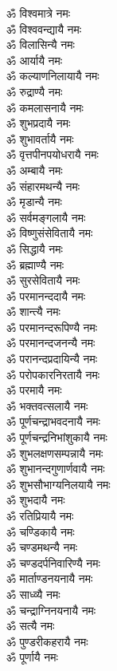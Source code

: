 \begin{multicols}{2}
\begin{flushleft}
ॐ विश्वमात्रे नमः\\
ॐ विश्ववन्द्यायै नमः\\
ॐ विलासिन्यै नमः\\
ॐ आर्यायै नमः\\
ॐ कल्याणनिलायायै नमः\\
ॐ रुद्राण्यै नमः\\
ॐ कमलासनायै नमः\\
ॐ शुभप्रदायै नमः\\
ॐ शुभावर्तायै नमः\\
ॐ वृत्तपीनपयोधरायै नमः\hfill{}\\
ॐ अम्बायै नमः\\
ॐ संहारमथन्यै नमः\\
ॐ मृडान्यै नमः\\
ॐ सर्वमङ्गलायै नमः\\
ॐ विष्णुसंसेवितायै नमः\\
ॐ सिद्धायै नमः\\
ॐ ब्रह्माण्यै नमः\\
ॐ सुरसेवितायै नमः\\
ॐ परमानन्ददायै नमः\\
ॐ शान्त्यै नमः\hfill{}\\
ॐ परमानन्दरूपिण्यै नमः\\
ॐ परमानन्दजनन्यै नमः\\
ॐ परानन्दप्रदायिन्यै नमः\\
ॐ परोपकारनिरतायै नमः\\
ॐ परमायै नमः\\
ॐ भक्तवत्सलायै नमः\\
ॐ पूर्णचन्द्राभवदनायै नमः\\
ॐ पूर्णचन्द्रनिभांशुकायै नमः\\
ॐ शुभलक्षणसम्पन्नायै नमः\\
ॐ शुभानन्दगुणार्णवायै नमः\hfill{}\\
ॐ शुभसौभाग्यनिलयायै नमः\\
ॐ शुभदायै नमः\\
ॐ रतिप्रियायै नमः\\
ॐ चण्डिकायै नमः\\
ॐ चण्डमथन्यै नमः\\
ॐ चण्डदर्पनिवारिण्यै नमः\\
ॐ मार्ताण्डनयनायै नमः\\
ॐ साध्व्यै नमः\\
ॐ चन्द्राग्निनयनायै नमः\\
ॐ सत्यै नमः\hfill{}\\
ॐ पुण्डरीकहरायै नमः\\
ॐ पूर्णायै नमः\\

\end{flushleft}
\end{multicols}
